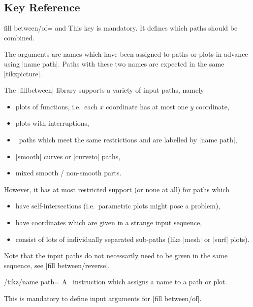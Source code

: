 \subsection{Key Reference}

\begin{tikzkey}{fill between/of= and }
	This key is mandatory. It defines which paths should be combined.

	The arguments are names which have been assigned to paths or plots in advance using |name path|. Paths with these two names are expected in the same |tikzpicture|.

	The |fillbetween| library supports a variety of input paths, namely
	\begin{itemize}
		\item plots of functions, i.e.\ each $x$ coordinate has at most one $y$ coordinate,
		\item plots with interruptions,
		\item \Tikz\ paths which meet the same restrictions and are labelled by |name path|,
		\item |smooth| curves or |curveto| paths,
		\item mixed smooth / non-smooth parts.
	\end{itemize}
	However, it has at most restricted support (or none at all) for paths which
	\begin{itemize}
		\item have self-intersections (i.e.\ parametric plots might pose a problem),
		\item have coordinates which are given in a strange input sequence,
		\item consist of lots of individually separated sub-paths (like |mesh| or |surf| plots).
	\end{itemize}

	Note that the input paths do not necessarily need to be given in the same sequence, see |fill between/reverse|.
\end{tikzkey}

\begin{key}{/tikz/name path=}
	A \Tikz\ instruction which assigns a name to a path or plot.

	This is mandatory to define input arguments for |fill between/of|.
\end{key}

